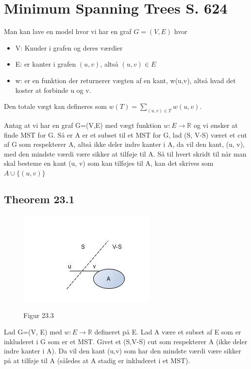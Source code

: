 \documentclass[11pt,a4paper]{report}
\theoremstyle{plain}
\theoremstyle{definition}
\theoremstyle{remark}
\numberwithin{equation}{section}
\begin{document}


\chapter{Minimum Spanning Trees S. 624}

Man kan lave en model hvor vi har en graf $G = (V, E)$ hvor
\begin{itemize}
  \item V: Knuder i grafen og deres værdier
  \item E: er kanter i grafen $(u, v)$, altså $(u, v) \in E$
  \item w: er en funktion der returnerer vægten af en kant, w(u,v), altså hvad det koster at forbinde u og v.
\end{itemize}
Den totale vægt kan defineres som $w(T) = \sum_{(u,v)\in T} w(u,v)$.

Antag at vi har en graf G=(V,E) med vægt funktion $w:E\rightarrow \mathbb{R}$ og vi ønsker at finde MST for G.  Så er A er et subset til et MST for G, lad (S, V-S) været et cut af G som respekterer A, altså ikke deler indre kanter i A, da vil den kant, (u, v), med den mindste værdi være sikker at tilføje til A. Så til hvert skridt til når man skal besteme en kant (u, v) som kan tilføjes til A, kan det skrives som $A\cup \{(u,v)\}$

\section{Theorem 23.1}

\begin{figure}[H]
  \centering
  \includegraphics[scale=1]{MSTcut.jpg}\\
  \caption{Figur 23.3}
\end{figure}

Lad G=(V, E) med $w:E\rightarrow \mathbb{R}$ defineret på E. Lad A være et subset af E som er inkluderet i G som er et MST.
Givet et (S,V-S) cut som respekterer A (ikke deler indre kanter i A). Da vil den kant (u,v) som har den mindste værdi være sikker på at tilføje til A (således at A stadig er inkluderet i et MST).
\end{document}
